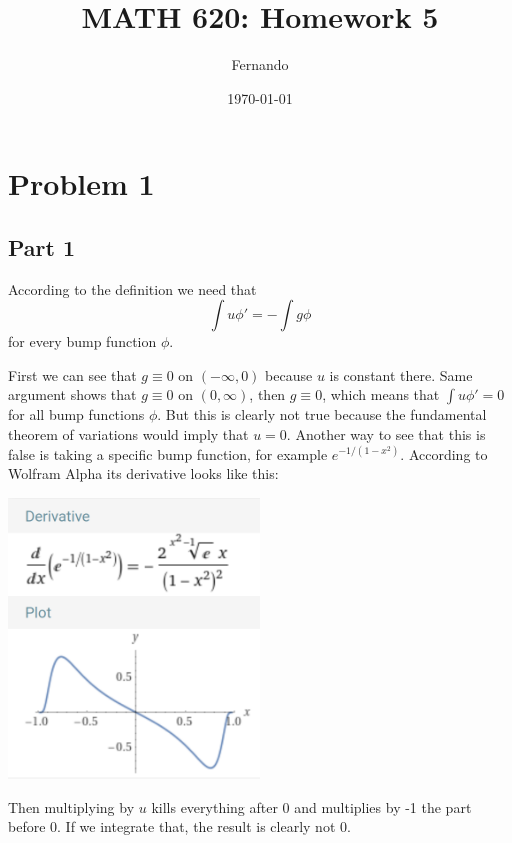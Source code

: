 \documentclass{article}
\title{MATH 620: Homework 5}
\author{Fernando}
\date{\today}
\begin{document}
\maketitle
\section*{Problem 1}
\subsection*{Part 1}
According to the definition we need that
\[
	\int u \phi' = -\int g \phi
\]
for every bump function $\phi$.

First we can see that $g\equiv 0$ on $(-\infty,0)$ because $u$ is constant
there. Same argument shows that $g\equiv 0$ on $(0,\infty)$, then
$g\equiv 0$, which means that $\int u \phi' = 0$ for all bump
functions $\phi$. But this is clearly not true because the fundamental theorem
of variations would imply that $u=0$. Another way to see that this is false is
taking a specific bump function, for example $e^{-1/(1-x^2)}$. According to
Wolfram Alpha its derivative looks like this:

\begin{center}
\includegraphics[width=0.5\textwidth]{bumpPrime.png}
\end{center}

Then multiplying by $u$ kills everything after 0 and multiplies by -1 the part
before 0. If we integrate that, the result is clearly not 0.
\end{document}
